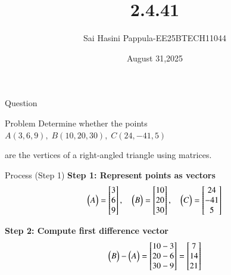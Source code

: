 \documentclass{beamer}
\title %
{2.4.41}
\date{August 31,2025}
\author %
{Sai Hasini Pappula-EE25BTECH11044}
\begin{document}
\begin{frame}
  \titlepage
\end{frame}

\begin{frame}{Question}
\begin{block}{Problem}
Determine whether the points 
$A(3,6,9), \; B(10,20,30), \; C(24,-41,5)$

are the vertices of a right-angled triangle using matrices.
\end{block}
\end{frame}

\begin{frame}{Process (Step 1)}
\textbf{Step 1: Represent points as vectors} \\
\begin{equation}
\begin{pmatrix}A\end{pmatrix}=\begin{bmatrix}3\\6\\9\end{bmatrix}, \quad
\begin{pmatrix}B\end{pmatrix}=\begin{bmatrix}10\\20\\30\end{bmatrix}, \quad
\begin{pmatrix}C\end{pmatrix}=\begin{bmatrix}24\\-41\\5\end{bmatrix}
\end{equation}

\textbf{Step 2: Compute first difference vector} \\
\begin{equation}
\begin{pmatrix}B\end{pmatrix}-\begin{pmatrix}A\end{pmatrix} =
\begin{bmatrix}10-3\\20-6\\30-9\end{bmatrix} =
\begin{bmatrix}7\\14\\21\end{bmatrix}
\end{equation}
\end{frame}
\end{document}
